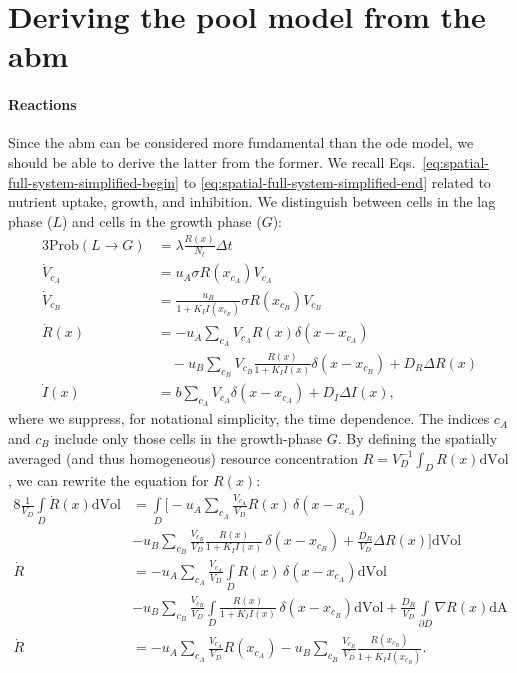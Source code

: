 \documentclass[10pt,1p,authoryear]{elsarticle}
\numberwithin{equation}{section}
\begin{document}
\section{Deriving the pool model from the \acs{abm}}
\label{sec:supplement-abm-derivation}
\paragraph{Reactions}
Since the \ac{abm} can be considered more fundamental than the \ac{ode} model, we should be able to derive the latter from the former.
We recall Eqs.~\eqref{eq:spatial-full-system-simplified-begin} to \eqref{eq:spatial-full-system-simplified-end} related to nutrient uptake, growth, and inhibition. We distinguish between cells in the lag phase ($L$) and cells in the growth phase ($G$): 
\begin{alignat}{3}
	\text{Prob}(L\to G) &= \lambda \frac{R(x)}{N_t}\Delta t\\
    \dot{V}_{c_A} &=u_A \sigma R(x_{c_A})V_{c_A}\\
    \dot{V}_{c_B} &=\frac{u_B}{1+K_I I(x_{c_B})} \sigma R(x_{c_B}) V_{c_B}\\
    \dot{R}(x) &= -u_A \sum\limits_{c_A}V_{c_A} R(x) \delta(x-x_{c_A})\\
        &\quad-u_B\sum\limits_{c_B}V_{c_B} \frac{R(x)}{1+K_I I(x)}\delta(x-x_{c_B}) + D_R \Delta R(x)\nonumber\\
    \dot{I}(x) &=b\sum\limits_{c_A} V_{c_A}\delta(x-x_{c_A}) + D_I\Delta I(x), 
\end{alignat}
where we suppress, for notational simplicity, the time dependence. The indices $c_A$ and $c_B$ include only those cells in the growth-phase $G$. By defining the spatially averaged (and thus homogeneous) resource concentration $R=V_D^{-1}\int_D R(x) \text{dVol}$, we can rewrite the equation for $R(x)$:
\begin{alignat}{8}
    \frac{1}{V_D}\int\limits_D\dot{R}(x)\text{dVol}
    &= \int\limits_D\bigg[-u_A \sum\limits_{c_A} \frac{V_{c_A}}{V_D} R(x)\, \delta(x-x_{c_A})\nonumber\\
        &-u_B\sum\limits_{c_B} \frac{V_{c_B}}{V_D} \frac{R(x)}{1+K_I I(x)} \, \delta(x-x_{c_B})
        +\frac{D_R}{V_D} \Delta R(x)\bigg]\text{dVol}\\
    \dot{R}&= -u_A\sum\limits_{c_A} \frac{V_{c_A}}{V_D}\int\limits_D R(x)\, \delta(x-x_{c_A}) \text{dVol}\nonumber\\
        &-u_B \sum\limits_{c_B} \frac{V_{c_B}}{V_D} \int\limits_D \frac{R(x)}{1+K_I I(x)} \, \delta(x-x_{c_B})\text{dVol}
        +\frac{D_R}{V_D}  \int\limits_{\partial D} \nabla R(x)\text{dA}\\
    \dot{R}&= -u_A\sum\limits_{c_A}  \frac{V_{c_A}}{V_D} R(x_{c_A})
        -u_B  \sum\limits_{c_B}  \frac{V_{c_B}}{V_D} \frac{R(x_{c_B})}{1+K_I I(x_{c_B})}.
\end{alignat}
\end{document}
